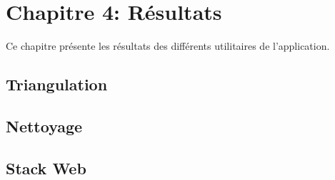 \chapter{Chapitre 4: Résultats}
Ce chapitre présente les résultats des différents utilitaires de l'application.
\section{Triangulation}
\section{Nettoyage}
\section{Stack Web}